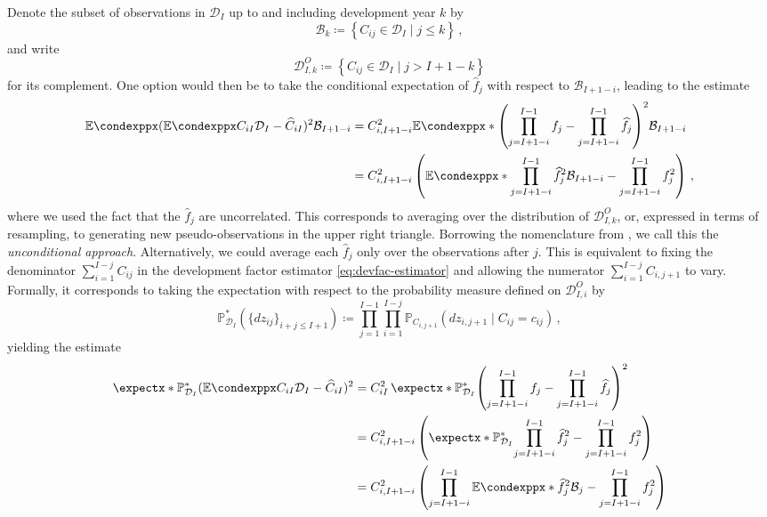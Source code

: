 \documentclass[a4paper]{book}
\begin{document}
Denote the subset of observations in $\mathcal{D}_I$ up to and including development year $k$ by
\begin{equation}
  \mathcal{B}_k \coloneqq \left \{ C_{ij} \in \mathcal{D}_I \mid j \leq k \right \} \,,
\end{equation}
and write
\begin{equation}
  \mathcal{D}^O_{I, k} \coloneqq \left \{ C_{ij} \in \mathcal{D}_I \mid j > I + 1 - k \right \}
\end{equation}
for its complement. One option would then be to take the conditional expectation of $\widehat{f}_j$ with respect to $\mathcal{B}_{I+1-i}$, leading to the estimate
\begin{align} \label{eq:uncond-param-err}
  \condexpp{(\condexpp{C_{iI}}{\mathcal{D}_I} - \widehat{C}_{iI})^2}{\mathcal{B}_{I+1-i}} & = C^2_{i, I+1-i} \condexpp*{\left( \prod_{j=I+1-i}^{I-1}f_j - \prod_{j=I+1-i}^{I-1}\widehat{f}_j \right)^2}{\mathcal{B}_{I+1-i}}      \\
                                                                                          & = C^2_{i, I+1-i} \left( \condexpp*{\prod_{j=I+1-i}^{I-1}\widehat{f}^2_j}{\mathcal{B}_{I+1-i}} - \prod_{j=I+1-i}^{I-1}f^2_j \right)\,,
\end{align}
where we used the fact that the $\widehat{f}_j$ are uncorrelated. This corresponds to averaging over the distribution of $\mathcal{D}^O_{I, k}$, or, expressed in terms of resampling, to generating new pseudo-observations in the upper right triangle. Borrowing the nomenclature from \cite{wuthrich:chain-ladder-msep}, we call this the \emph{unconditional approach}. Alternatively, we could average each $\widehat{f}_j$ only over the observations after $j$. This is equivalent to fixing the denominator $\sum_{i = 1}^{I - j} C_{ij}$ in the development factor estimator \cref{eq:devfac-estimator} and allowing the numerator $\sum_{i = 1}^{I - j} C_{i, j + 1}$ to vary. Formally, it corresponds to taking the expectation with respect to the probability measure defined on $\mathcal{D}^O_{I, i}$ by
\begin{equation}
  \mathbb{P}^*_{\mathcal{D}_I}(\{ dz_{ij} \}_{i + j \leq I + 1}) \coloneqq \prod_{j = 1}^{I - 1} \prod_{i = 1}^{I - j}  \mathbb{P}_{C_{i, j + 1}}(dz_{i, j + 1} \mid C_{ij} = c_{ij}) \,,
\end{equation}
yielding the estimate
\begin{align}
  \expect[\mathbb{P}^*_{\mathcal{D}_I}]{(\condexpp{C_{iI}}{\mathcal{D}_I} - \widehat{C}_{iI})^2} & = C^2_{iI} \, \expect[\mathbb{P}^*_{\mathcal{D}_I}]{\left( \prod_{j=I+1-i}^{I-1}f_j - \prod_{j=I+1-i}^{I-1}\widehat{f}_j \right)^2}      \\
                                                                                                 & = C^2_{i, I+1-i} \left( \expect[\mathbb{P}^*_{\mathcal{D}_I}]{\prod_{j=I+1-i}^{I-1}\widehat{f}^2_j} - \prod_{j=I+1-i}^{I-1}f^2_j \right) \\
                                                                                                 & = C^2_{i, I+1-i} \left( \prod_{j=I+1-i}^{I-1} \condexpp*{\widehat{f}^2_j}{\mathcal{B}_j} - \prod_{j=I+1-i}^{I-1}f^2_j \right)
\end{align}
\end{document}
